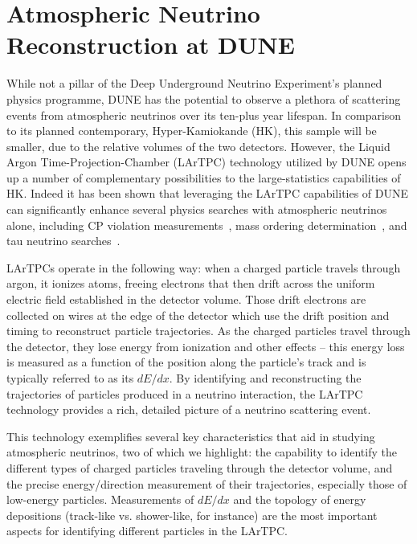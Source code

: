 
\section{Atmospheric Neutrino Reconstruction at DUNE}\label{sec:DUNEDetails}

While not a pillar of the Deep Underground Neutrino Experiment's planned physics programme, DUNE has the potential to observe a plethora of scattering events from atmospheric neutrinos over its ten-plus year lifespan. In comparison to its planned contemporary, Hyper-Kamiokande (HK), this sample will be smaller, due to the relative volumes of the two detectors. 
However, the Liquid Argon Time-Projection-Chamber (LArTPC) technology utilized by DUNE opens up a number of complementary possibilities to the large-statistics capabilities of HK.
Indeed it has been shown that leveraging the LArTPC capabilities of DUNE can significantly enhance several physics searches with atmospheric neutrinos alone, including CP violation measurements~\cite{Kelly:2019itm}, mass ordering determination~\cite{Ternes:2019sak}, and tau neutrino searches~\cite{Conrad:2010mh}.


LArTPCs operate in the following way: when a charged particle travels through argon, it ionizes atoms, freeing electrons that then drift across the uniform electric field established in the detector volume. Those drift electrons are collected on wires at the edge of the detector which use the drift position and timing to reconstruct particle trajectories. As the charged particles travel through the detector, they lose energy from ionization and other effects -- this energy loss is measured as a function of the position along the particle's track and is typically referred to as its $dE/dx$. By identifying and reconstructing the trajectories of particles produced in a neutrino interaction, the LArTPC technology provides a rich, detailed picture of a neutrino scattering event.

This technology exemplifies several key characteristics that aid in studying atmospheric neutrinos, two of which we highlight: the capability to identify the different types of charged particles traveling through the detector volume, and the precise energy/direction measurement of their trajectories, especially those of low-energy particles. Measurements of $dE/dx$ and the topology of energy depositions (track-like vs. shower-like, for instance) are the most important aspects for identifying different particles in the LArTPC. 

